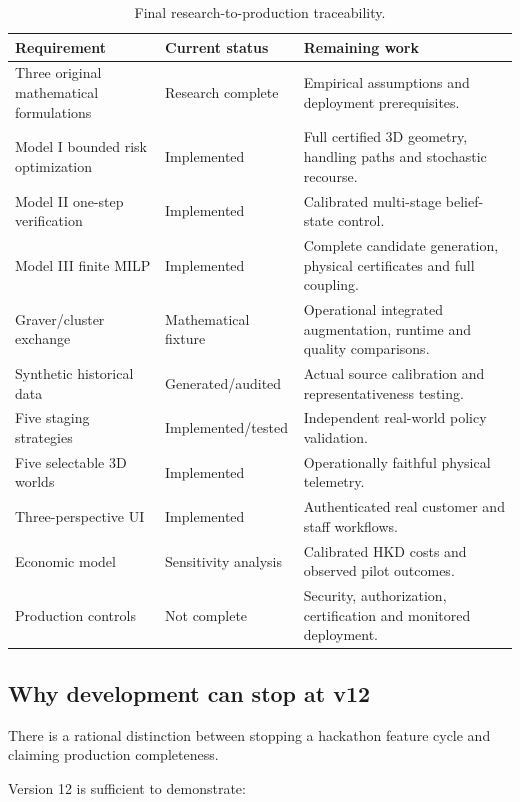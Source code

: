 \documentclass[10pt,a4paper]{article}
\theoremstyle{plain}
\theoremstyle{definition}
\theoremstyle{remark}
\begin{document}
\begin{table}[!htbp]
\centering
\caption{
Final research-to-production traceability.
}
\label{tab:gaps}
\small
\begin{tabularx}{\linewidth}{@{}p{33mm}p{28mm}L@{}}
\toprule
Requirement &
Current status &
Remaining work \\
\midrule
Three original mathematical formulations &
Research complete &
Empirical assumptions and
deployment prerequisites. \\
Model I bounded risk optimization &
Implemented &
Full certified 3D geometry,
handling paths and stochastic recourse. \\
Model II one-step verification &
Implemented &
Calibrated multi-stage
belief-state control. \\
Model III finite MILP &
Implemented &
Complete candidate generation,
physical certificates and full coupling. \\
Graver/cluster exchange &
Mathematical fixture &
Operational integrated augmentation,
runtime and quality comparisons. \\
Synthetic historical data &
Generated/audited &
Actual source calibration
and representativeness testing. \\
Five staging strategies &
Implemented/tested &
Independent real-world policy validation. \\
Five selectable 3D worlds &
Implemented &
Operationally faithful physical telemetry. \\
Three-perspective UI &
Implemented &
Authenticated real customer
and staff workflows. \\
Economic model &
Sensitivity analysis &
Calibrated HKD costs
and observed pilot outcomes. \\
Production controls &
Not complete &
Security, authorization,
certification and monitored deployment. \\
\bottomrule
\end{tabularx}
\end{table}

\subsection{Why development can stop at v12}

There is a rational distinction between
stopping a hackathon feature cycle
and claiming production completeness.

Version 12 is sufficient to demonstrate:
\end{document}
